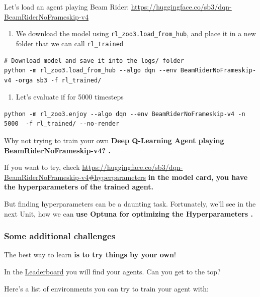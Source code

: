 \documentclass[11pt,a4paper]{article}
\begin{document}
Let's load an agent playing Beam Rider: \url{https://huggingface.co/sb3/dqn-BeamRiderNoFrameskip-v4}

\begin{enumerate}
\def\labelenumi{\arabic{enumi}.}
\tightlist
\item
  We download the model using \texttt{rl\_zoo3.load\_from\_hub}, and place it in a new folder that we can call \texttt{rl\_trained}
\end{enumerate}

\begin{lstlisting}
# Download model and save it into the logs/ folder
python -m rl_zoo3.load_from_hub --algo dqn --env BeamRiderNoFrameskip-v4 -orga sb3 -f rl_trained/
\end{lstlisting}

\begin{enumerate}
\def\labelenumi{\arabic{enumi}.}
\setcounter{enumi}{1}
\tightlist
\item
  Let's evaluate if for 5000 timesteps
\end{enumerate}

\begin{lstlisting}
python -m rl_zoo3.enjoy --algo dqn --env BeamRiderNoFrameskip-v4 -n 5000  -f rl_trained/ --no-render
\end{lstlisting}

Why not trying to train your own \textbf{Deep Q-Learning Agent playing BeamRiderNoFrameskip-v4? .}

If you want to try, check \url{https://huggingface.co/sb3/dqn-BeamRiderNoFrameskip-v4#hyperparameters} \textbf{in the model card, you have the hyperparameters of the trained agent.}

But finding hyperparameters can be a daunting task. Fortunately, we'll see in the next Unit, how we can \textbf{use Optuna for optimizing the Hyperparameters .}

\subsubsection{Some additional challenges}\label{some-additional-challenges}

The best way to learn \textbf{is to try things by your own}!

In the \href{https://huggingface.co/spaces/huggingface-projects/Deep-Reinforcement-Learning-Leaderboard}{Leaderboard} you will find your agents. Can you get to the top?

Here's a list of environments you can try to train your agent with:
\end{document}
